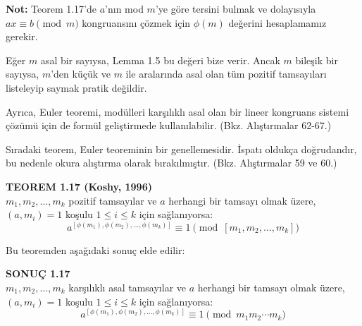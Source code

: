 \vspace{2em}

\begin{tcolorbox}[colback=yellow!5, colframe=orange!60!black, title=\textbf{Euler Teoremi Üzerine Sonuçlar ve Genellemeler}, fonttitle=\bfseries, sharp corners]

\textbf{Not:} Teorem 1.17'de $a$'nın mod $m$'ye göre tersini bulmak ve dolayısıyla $ax \equiv b \pmod{m}$ kongruansını çözmek için $\phi(m)$ değerini hesaplamamız gerekir.

Eğer $m$ asal bir sayıysa, Lemma 1.5 bu değeri bize verir. Ancak $m$ bileşik bir sayıysa, $m$'den küçük ve $m$ ile aralarında asal olan tüm pozitif tamsayıları listeleyip saymak pratik değildir.

Ayrıca, Euler teoremi, modülleri karşılıklı asal olan bir lineer kongruans sistemi çözümü için de formül geliştirmede kullanılabilir. (Bkz. Alıştırmalar 62-67.)

Sıradaki teorem, Euler teoreminin bir genellemesidir. İspatı oldukça doğrudandır, bu nedenle okura alıştırma olarak bırakılmıştır. (Bkz. Alıştırmalar 59 ve 60.)

\begin{center}
\textbf{TEOREM 1.17 (Koshy, 1996)}\\
$m_1, m_2, \ldots, m_k$ pozitif tamsayılar ve $a$ herhangi bir tamsayı olmak üzere, \\
$(a, m_i) = 1$ koşulu $1 \leq i \leq k$ için sağlanıyorsa:
\[
a^{[\phi(m_1), \phi(m_2), \ldots, \phi(m_k)]} \equiv 1 \pmod{[m_1, m_2, \ldots, m_k]}
\]
\end{center}

Bu teoremden aşağıdaki sonuç elde edilir:

\begin{center}
\textbf{SONUÇ 1.17}\\
$m_1, m_2, \ldots, m_k$ karşılıklı asal tamsayılar ve $a$ herhangi bir tamsayı olmak üzere, \\
$(a, m_i) = 1$ koşulu $1 \leq i \leq k$ için sağlanıyorsa:
\[
a^{[\phi(m_1), \phi(m_2), \ldots, \phi(m_k)]} \equiv 1 \pmod{m_1 m_2 \cdots m_k}
\]
\end{center}

\end{tcolorbox}



\ifdefined\isSubfile
\else

\fi